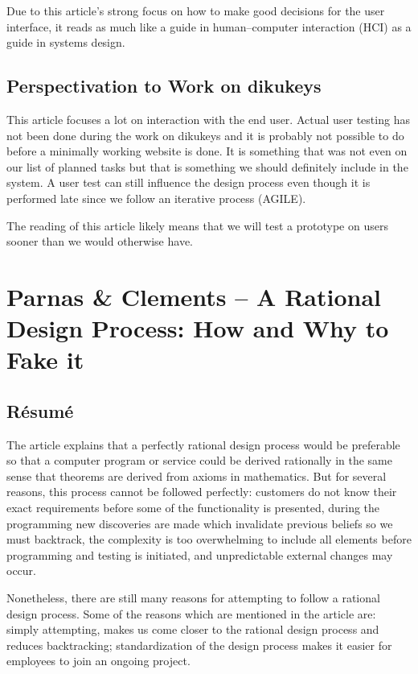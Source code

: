 \documentclass[11pt,a4paper]{report}
\begin{document}
Due to this article's strong focus on how to make good decisions for the user interface, it reads as much like a guide in human–computer interaction (HCI) as a guide in systems design.
\subsection{Perspectivation to Work on dikukeys}
This article focuses a lot on interaction with the end user. Actual user testing has not been done during the work on dikukeys and it is probably not possible to do before a minimally working website is done. It is something that was not even on our list of planned tasks but that is something we should definitely include in the system. A user test can still influence the design process even though it is performed late since we follow an iterative process (AGILE).

The reading of this article likely means that we will test a prototype on users sooner than we would otherwise have.

\section{Parnas \& Clements -- A Rational Design Process: How and Why to
Fake it}
\subsection{Résumé}
The article explains that a perfectly rational design process would be preferable so that a computer program or service could be derived rationally in the same sense that theorems are derived from axioms in mathematics. But for several reasons, this process cannot be followed perfectly: customers do not know their exact requirements before some of the functionality is presented, during the programming new discoveries are made which invalidate previous beliefs so we must backtrack, the complexity is too overwhelming to include all elements before programming and testing is initiated, and unpredictable external changes may occur.

Nonetheless, there are still many reasons for attempting to follow a rational design process. Some of the reasons which are mentioned in the article are: simply attempting, makes us come closer to the rational design process and reduces backtracking; standardization of the design process makes it easier for employees to join an ongoing project.
\end{document}
